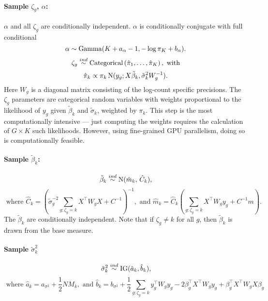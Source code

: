 \paragraph{Sample $\zeta_g$, $\alpha$:}
$\alpha$ and all $\zeta_g$ are conditionally independent.
$\alpha$ is conditionally conjugate with full conditional
\begin{equation*}
\alpha \sim \operatorname{Gamma}(K + a_\alpha - 1, -\log \pi_K + b_\alpha).
\end{equation*}
\begin{equation*}
\zeta_g \stackrel{ind}{\sim} \operatorname{Categorical}\left(\hat{\pi}_1,\ldots,\hat{\pi}_K \right), \mbox{ with}
\end{equation*}
\begin{equation*}
\hat{\pi}_k \propto \pi_k \operatorname{N}(y_g;X\tilde{\beta}_k,\tilde{\sigma}_k^2 W_g^{-1}).
\end{equation*}
Here $W_g$ is a diagonal matrix consisting of the log-count specific precisions. The $\zeta_g$ parameters are categorical random variables with weights proportional to the likelihood of $y_g$ given $\tilde{\beta}_k$ and $\tilde{\sigma}_k$, weighted by $\pi_k$. This step is the most computationally intensive --- just computing the weights requires the calculation of $G\times K$ such likelihoods. However, using fine-grained GPU parallelism, doing so is computationally feasible. 


\paragraph{Sample $\tilde{\beta}_k$:}
\begin{equation*}
\tilde{\beta}_k \stackrel{ind}{\sim} \operatorname{N}(\hat{m}_k,\, \hat{C}_k),
\end{equation*}
\begin{equation*}
\mbox{ where }\hat{C}_k= \left( \tilde{\sigma}^{-2}_g\sum_{g:\zeta_g=k}
  X^\top W_g X + C^{-1} \right)^{-1}, \mbox{ and }\hat{m}_k=\hat{C}_k \left(\sum_{g:\zeta_g=k} X^\top W_g y_g +
      C^{-1}m \right).
\end{equation*}
The $\tilde{\beta}_k$ are conditionally independent. Note that if $\zeta_g \neq k$ for all $g$, then $\tilde{\beta}_k$ is drawn from the base measure.

\paragraph{Sample $\tilde{\sigma}_k^2$}
\begin{equation*}
      \tilde{\sigma}_k^2 \stackrel{ind}{\sim} \operatorname{IG}(\hat{a}_k,\hat{b}_k),
    \end{equation*}
    \begin{equation*}
      \mbox{ where }\hat{a}_k = a_{\sigma^2} + \frac{1}{2}NM_k,\mbox{ and }\hat{b}_k= b_{\sigma^2} + \frac{1}{2}\sum_{g:\zeta_g=k}y_g^\top W_g y_g -2 \beta_g^\top X^\top W_g y_g  +\beta_g^\top X^\top W_g X \beta_g
    \end{equation*}

